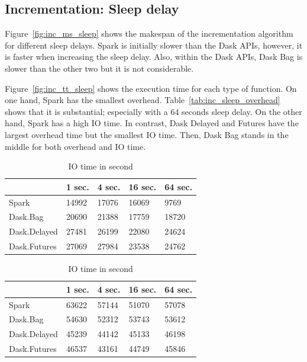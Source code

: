 \documentclass[conference]{IEEEtran}
\begin{document}
\subsection{Incrementation: Sleep delay}
Figure~\ref{fig:inc_ms_sleep} shows the makespan of the incrementation algorithm for
different sleep delays. Spark is initially slower than the Dask APIs, however, it is
faster when increasing the sleep delay. Also, within the Dask APIs, Dask Bag is
slower than the other two but it is not considerable.

Figure~\ref{fig:inc_tt_sleep} shows the execution time for each type of function. On
one hand, Spark has the smallest overhead. Table~\ref{tab:inc_sleep_overhead} shows
that it is substantial; especially with a 64 seconds sleep delay. On the other hand,
Spark has a high IO time. In contrast, Dask Delayed and Futures have the largest
overhead time but the smallest IO time. Then, Dask Bag stands in the middle for both
overhead and IO time.

\begin{table}[!t]
    \caption{Function time for the sleep experiment}
    \begin{subtable}[b]{\columnwidth}
        \renewcommand{\arraystretch}{1.3}
        \caption{Overhead time in second}\label{tab:inc_sleep_overhead}
        \centering
        \begin{tabular}{lllll}
        \hline
                     & 1 sec. & 4 sec. & 16 sec. & 64 sec. \\ \hline
        Spark        & 14992  & 17076  & 16069   & 9769    \\
        Dask.Bag     & 20690  & 21388  & 17759   & 18720   \\
        Dask.Delayed & 27481  & 26199  & 22080   & 24624   \\
        Dask.Futures & 27069  & 27984  & 23538   & 24762   \\ \hline
        \end{tabular}
    \end{subtable}
    \vskip 0.2cm
    \begin{subtable}[b]{\columnwidth}
        \renewcommand{\arraystretch}{1.3}
        \caption{IO time in second}\label{tab:inc_sleep_io}
        \centering
        \begin{tabular}{lllll}
        \hline
                     & 1 sec. & 4 sec. & 16 sec. & 64 sec. \\ \hline
        Spark        & 63622  & 57144  & 51070   & 57078   \\
        Dask.Bag     & 54630  & 52312  & 53743   & 53612   \\
        Dask.Delayed & 45239  & 44142  & 45133   & 46198   \\
        Dask.Futures & 46537  & 43161  & 44749   & 45846   \\ \hline
        \end{tabular}
    \end{subtable}
    \vspace{-3mm}
 \end{table}
\end{document}
